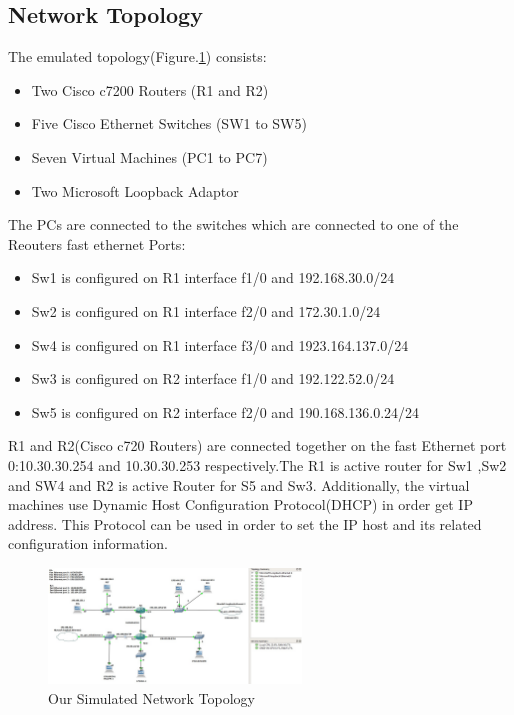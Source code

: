 \documentclass{article}
\begin{document}
\subsection{Network Topology}

The emulated topology(Figure.\ref{fig:TPLGY}) consists:

\begin{itemize}
	
	\item Two Cisco c7200 Routers (R1 and R2)
	\item Five Cisco Ethernet Switches (SW1 to SW5)
	\item Seven Virtual Machines (PC1 to PC7)
	\item Two Microsoft Loopback Adaptor 
\end{itemize}

The PCs are connected to the switches which are connected to one of the Reouters fast ethernet Ports:


\begin{itemize}
	
	\item Sw1 is configured on R1 interface f1/0 and 192.168.30.0/24
	\item Sw2 is configured on R1 interface f2/0 and 172.30.1.0/24
	\item Sw4 is configured on R1 interface f3/0 and 1923.164.137.0/24
	\item Sw3 is configured on R2 interface f1/0 and 192.122.52.0/24
	\item Sw5 is configured on R2 interface f2/0 and 190.168.136.0.24/24
\end{itemize}

R1 and R2(Cisco c720 Routers) are connected together on the fast Ethernet port 0:10.30.30.254 and 10.30.30.253 respectively.The R1 is active router for Sw1 ,Sw2 and SW4 and R2 is active Router for S5 and Sw3. Additionally, the virtual machines use Dynamic Host Configuration Protocol(DHCP) in order get IP address. This Protocol can be used in order to set the IP host and its related configuration information.


\begin{figure}[H]
	\begin{center}
		\includegraphics[width=0.6\textwidth]{Topology.jpg}
	\end{center}
	\caption{\small  Our Simulated Network Topology\newline}
	\label{fig:TPLGY}
\end{figure}
\end{document}
